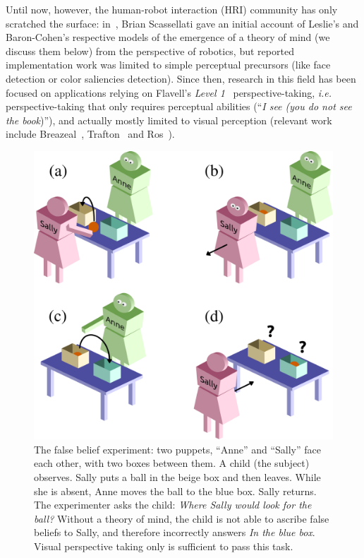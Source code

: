 \documentclass{sig-alternate}
\newcommand{\ie}{{\textit{i.e.~}}}
\begin{document}
Until now, however, the human-robot interaction (HRI) community has only
scratched the surface: in~\cite{scassellati2002theory}, Brian Scassellati gave
an initial account of Leslie's and Baron-Cohen's respective models of the
emergence of a theory of mind (we discuss them below) from the perspective of
robotics, but reported implementation work was limited to simple perceptual
precursors (like face detection or color saliencies detection). Since then,
research in this field has been focused on applications relying on Flavell's
\emph{Level 1}~\cite{flavell1977development} perspective-taking, \ie
perspective-taking that only requires perceptual abilities (``\emph{I see (you do
not see the book})''), and actually mostly limited to visual perception (relevant
work include Breazeal~\cite{Breazeal2006}, Trafton~\cite{Trafton2005} and
Ros~\cite{Ros2010}).

\begin{figure}[h!t]
        \centering
        \includegraphics[width=0.7\linewidth]{sally_ann}
        \caption{\small The false belief experiment: two puppets, ``Anne'' and
            ``Sally'' face each other, with two boxes between them. A child (the
            subject) observes. Sally puts a ball in the beige box and then leaves.
            While she is absent, Anne moves the ball to the blue box. Sally
            returns. The experimenter asks the child: \emph{Where Sally would look
            for the ball?} Without a theory of mind, the child is not able
            to ascribe false beliefs to Sally, and therefore incorrectly answers
            \emph{In the blue box}. Visual perspective taking only is sufficient
            to pass this task.}

        \label{false-beliefs}
\end{figure}
\end{document}
